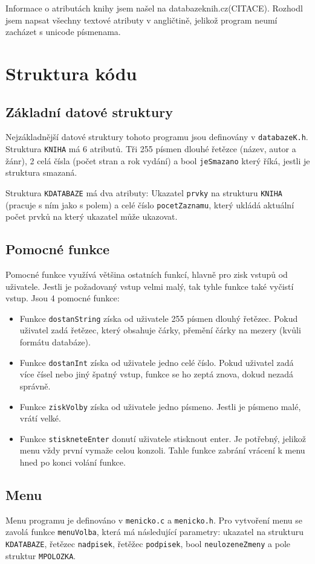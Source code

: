 Informace o atributách knihy jsem našel na databazeknih.cz(CITACE). Rozhodl jsem napsat všechny 
textové atributy v angličtině, jelikož program neumí zacházet s unicode písmenama.

\section{Struktura kódu}
\subsection{Základní datové struktury}
Nejzákladnější datové struktury tohoto programu jsou definovány v \texttt{databazeK.h}. Struktura 
\texttt{KNIHA} má 6 atributů. Tři 255 písmen dlouhé řetězce (název, autor a žánr), 2 celá čísla 
(počet stran a rok vydání) a bool \texttt{jeSmazano} který říká, jestli je struktura smazaná. 

Struktura \texttt{KDATABAZE} má dva atributy: Ukazatel \texttt{prvky} na strukturu \texttt{KNIHA} (pracuje s ním jako s polem) 
a celé číslo \texttt{pocetZaznamu}, který ukládá aktuální počet prvků na který ukazatel může ukazovat.

\subsection{Pomocné funkce}
Pomocné funkce využívá většina ostatních funkcí, hlavně pro zisk vstupů od uživatele. 
Jestli je požadovaný vstup velmi malý, tak tyhle funkce také vyčistí vstup. Jsou 4 pomocné funkce:
\begin{itemize}
  \item Funkce \texttt{dostanString} získa od uživatele 255 písmen dlouhý řetězec. 
  Pokud uživatel zadá řetězec, který obsahuje čárky, přemění čárky na mezery (kvůli formátu databáze).
  \item Funkce \texttt{dostanInt} získa od uživatele jedno celé číslo. Pokud uživatel zadá více 
  čísel nebo jiný špatný vstup, funkce se ho zeptá znova, dokud nezadá správně. 
  \item Funkce \texttt{ziskVolby} získa od uživatele jedno písmeno. Jestli je písmeno malé, vrátí velké. 
  \item Funkce \texttt{stiskneteEnter} donutí uživatele stisknout enter. Je potřebný, jelikož menu 
  vždy první vymaže celou konzoli. Tahle funkce zabrání vrácení k menu hned po konci volání funkce.
\end{itemize}

\subsection{Menu}
Menu programu je definováno v \texttt{menicko.c} a \texttt{menicko.h}. Pro vytvoření menu se zavolá funkce 
\texttt{menuVolba}, která má následující parametry: ukazatel na strukturu \texttt{KDATABAZE}, řetězec \texttt{nadpisek}, 
řetěžec \texttt{podpisek}, bool \texttt{neulozeneZmeny} a pole struktur \texttt{MPOLOZKA}. 

